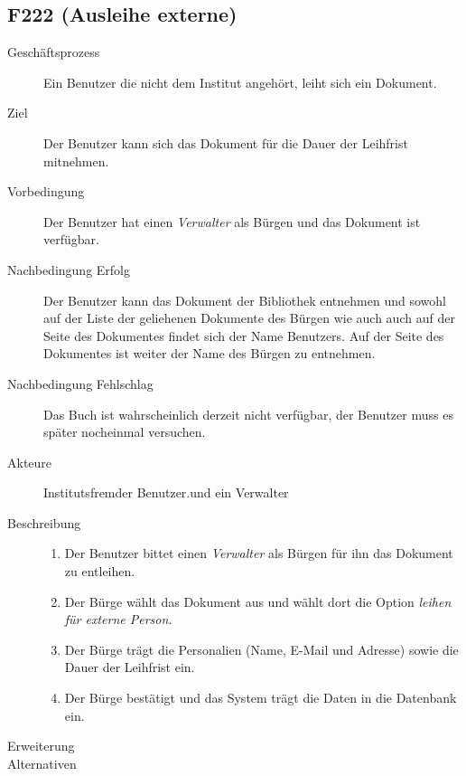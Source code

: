 \subsection{F222 (Ausleihe externe)}
\begin{description}
  \item[Geschäftsprozess]Ein Benutzer die nicht dem Institut angehört, leiht sich ein Dokument.
  \item[Ziel]Der Benutzer kann sich das Dokument für die Dauer der Leihfrist mitnehmen.
  \item[Vorbedingung]Der Benutzer hat einen \emph{Verwalter} als Bürgen und das Dokument ist verfügbar.
  \item[Nachbedingung Erfolg]Der Benutzer kann das Dokument der Bibliothek entnehmen und sowohl auf der Liste der geliehenen Dokumente des Bürgen wie auch auch auf der Seite des Dokumentes findet sich der Name Benutzers. Auf der Seite des Dokumentes ist weiter der Name des Bürgen zu entnehmen.
  \item[Nachbedingung Fehlschlag]Das Buch ist wahrscheinlich derzeit nicht verfügbar, der Benutzer muss es später nocheinmal versuchen.
  \item[Akteure]Institutsfremder Benutzer.und ein Verwalter
  \item[Beschreibung]\hfill
    \begin{enumerate}
      \item Der Benutzer bittet einen \emph{Verwalter} als Bürgen für ihn das Dokument zu entleihen.
      \item Der Bürge wählt das Dokument aus und wählt dort die Option \emph{leihen für externe Person}.
      \item Der Bürge trägt die Personalien (Name, E-Mail und Adresse) sowie die Dauer der Leihfrist ein.
      \item Der Bürge bestätigt und das System trägt die Daten in die Datenbank ein.
    \end{enumerate}
  \item[Erweiterung]
  \item[Alternativen]
\end{description}

